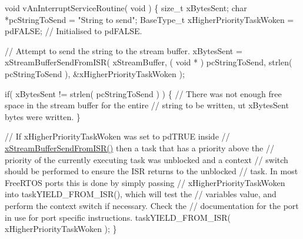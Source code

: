 \begin{DoxyPre}
\begin{DoxyPre}
\begin{DoxyPre}void vAnInterruptServiceRoutine( void )
\{
size\_t xBytesSent;
char *pcStringToSend = "String to send";
BaseType\_t xHigherPriorityTaskWoken = pdFALSE; // Initialised to pdFALSE.\end{DoxyPre}
\end{DoxyPre}
\end{DoxyPre}



\begin{DoxyPre}
\begin{DoxyPre}
\begin{DoxyPre}    // Attempt to send the string to the stream buffer.
    xBytesSent = xStreamBufferSendFromISR( xStreamBuffer,
                                           ( void * ) pcStringToSend,
                                           strlen( pcStringToSend ),
                                           \&xHigherPriorityTaskWoken );\end{DoxyPre}
\end{DoxyPre}
\end{DoxyPre}



\begin{DoxyPre}
\begin{DoxyPre}
\begin{DoxyPre}    if( xBytesSent != strlen( pcStringToSend ) )
    \{
        // There was not enough free space in the stream buffer for the entire
        // string to be written, ut xBytesSent bytes were written.
    \}\end{DoxyPre}
\end{DoxyPre}
\end{DoxyPre}



\begin{DoxyPre}
\begin{DoxyPre}
\begin{DoxyPre}    // If xHigherPriorityTaskWoken was set to pdTRUE inside
    // \mbox{\hyperlink{stream__buffer_8h_a1dab226e99230e01e79bc2b5c0605e44}{xStreamBufferSendFromISR()}} then a task that has a priority above the
    // priority of the currently executing task was unblocked and a context
    // switch should be performed to ensure the ISR returns to the unblocked
    // task.  In most FreeRTOS ports this is done by simply passing
    // xHigherPriorityTaskWoken into taskYIELD\_FROM\_ISR(), which will test the
    // variables value, and perform the context switch if necessary.  Check the
    // documentation for the port in use for port specific instructions.
    taskYIELD\_FROM\_ISR( xHigherPriorityTaskWoken );
\}
\end{DoxyPre}
 \end{DoxyPre}
\end{DoxyPre}
